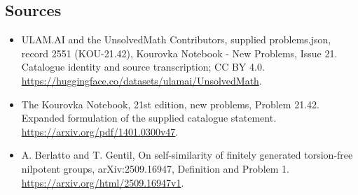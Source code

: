\documentclass[11pt,a4paper]{article}
\begin{document}
\subsection{Sources}
\begin{itemize}
\item[S1] ULAM.AI and the UnsolvedMath Contributors, supplied problems.json, record 2551 (KOU-21.42), Kourovka Notebook - New Problems, Issue 21. Catalogue identity and source transcription; CC BY 4.0.
\url{https://huggingface.co/datasets/ulamai/UnsolvedMath}.
\item[S2] The Kourovka Notebook, 21st edition, new problems, Problem 21.42. Expanded formulation of the supplied catalogue statement.
\url{https://arxiv.org/pdf/1401.0300v47}.
\item[S3] A. Berlatto and T. Gentil, On self-similarity of finitely generated torsion-free nilpotent groups, arXiv:2509.16947, Definition and Problem 1.
\url{https://arxiv.org/html/2509.16947v1}.
\end{itemize}
\end{document}
